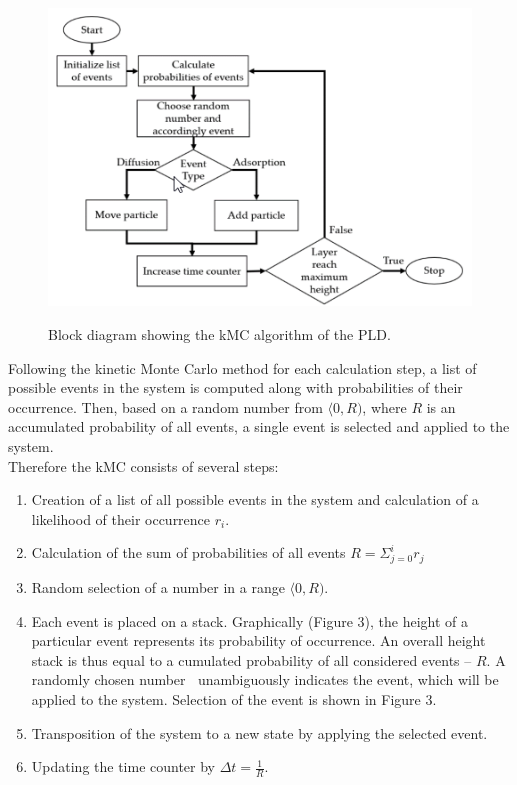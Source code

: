 \documentclass[journal,article,submit,pdftex,moreauthors]{Definitions/mdpi}
\begin{document}
\begin{figure}[h]
    \captionsetup{justification=centering}
    \centering
    \includegraphics{Definitions/picture2.png}
    \label{fig:obraz2}
    \caption{Block diagram showing the kMC algorithm of the PLD.}
    \end{figure}
 
    Following the kinetic Monte Carlo method for each calculation step, a list of possible events in the system is computed along with probabilities of their occurrence. Then, based on a random number from $\langle 0,R)$, where $R$ is an accumulated probability of all events, a single event is selected and applied to the system.\\
 
Therefore the kMC consists of several steps:
    \begin{enumerate}
        \item Creation of a list of all possible events in the system and calculation of a likelihood of their occurrence $r_i$.
        \item Calculation of the sum of probabilities of all events $R = \Sigma_{j=0}^ir_j$
        \item Random selection of a number in a range $\langle 0,R)$.
        \item Each event is placed on a stack. Graphically (Figure 3), the height of a particular event represents its probability of occurrence. An overall height stack is thus equal to a cumulated probability of all considered events – $R$. A randomly chosen number $\ $ unambiguously indicates the event, which will be applied to the system. Selection of the event is shown in Figure 3.
        \item Transposition of the system to a new state by applying the selected event.
        \item Updating the time counter by $\Delta t = \frac{1}{R}$.
    \end{enumerate}
 
\end{document}

